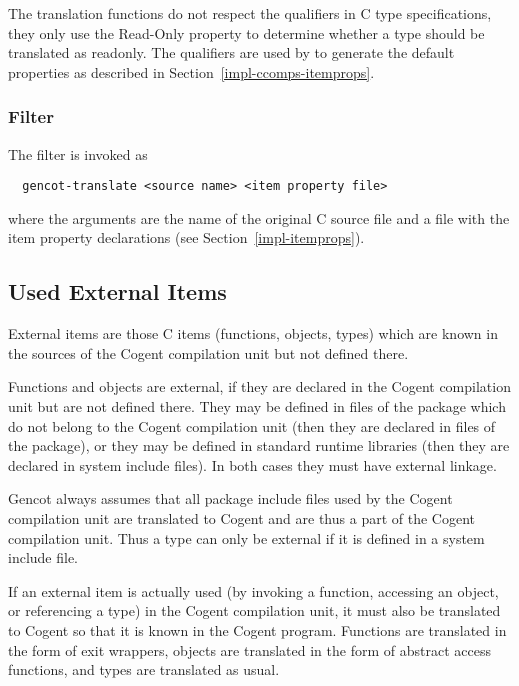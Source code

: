 The translation functions do not respect the  qualifiers in C type specifications, they only use the 
Read-Only property to determine whether a type should be translated as readonly. The  qualifiers are 
used by  to generate the default properties as described in Section~\ref{impl-ccomps-itemprops}. 

\subsubsection{Filter }

The filter  is invoked as
\begin{verbatim}
  gencot-translate <source name> <item property file>
\end{verbatim}
where the arguments are the name of the original C source file and a file with the item property declarations (see 
Section~\ref{impl-itemprops}).

\subsection{Used External Items}
\label{impl-ccomps-items}

External items are those C items (functions, objects, types) which are known in the sources of the Cogent compilation
unit but not defined there. 

Functions and objects are external, if they are declared in the 
Cogent compilation unit but are not defined there. They may be defined in files of the package which do not belong to
the Cogent compilation unit (then they are declared in  files of the package), or they may be defined in 
standard runtime libraries (then they are declared in system include files). In both cases they must have external linkage.

Gencot always assumes that all package include files used by the Cogent compilation unit are translated to Cogent and
are thus a part of the Cogent compilation unit. Thus a type can only be external if it is defined in a system include
file.

If an external item is actually used (by invoking a function, accessing an object, or referencing a type) in the Cogent
compilation unit, it must also be translated to Cogent so that it is known in the Cogent program. Functions are translated
in the form of exit wrappers, objects are translated in the form of abstract access functions, and types are translated
as usual.

